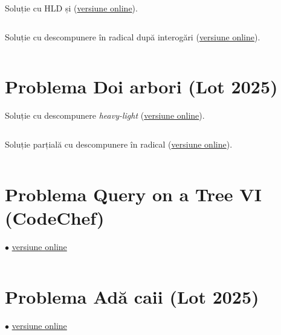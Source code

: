 \documentclass[../main.tex]{subfiles}
\begin{document}
\inputminted{cpp}{../src/trees/rafaela-hld.cpp}

Soluție cu HLD și  (\href{https://kilonova.ro/submissions/515722}{versiune online}).

\inputminted{cpp}{../src/trees/rafaela-hld-multiset.cpp}

Soluție cu descompunere în radical după interogări (\href{https://kilonova.ro/submissions/519568}{versiune online}).

\inputminted{cpp}{../src/trees/rafaela-sqrt.cpp}

\section{Problema Doi arbori (Lot 2025)}
\label{code:doi-arbori}

Soluție cu descompunere \textit{heavy-light} (\href{https://kilonova.ro/submissions/514375}{versiune online}).

\inputminted{cpp}{../src/trees/doi-arbori-hld.cpp}

Soluție parțială cu descompunere în radical (\href{https://kilonova.ro/submissions/515387}{versiune online}).

\inputminted{cpp}{../src/trees/doi-arbori-sqrt.cpp}

\section{Problema Query on a Tree VI (CodeChef)}
\label{code:qtree6}
$\bullet$
\href{https://www.codechef.com/viewsolution/1120642189}{versiune online}

\inputminted{cpp}{../src/trees/qtree6.cpp}

\section{Problema Adă caii (Lot 2025)}
\label{code:ada-caii}
$\bullet$
\href{https://kilonova.ro/submissions/774636}{versiune online}

\inputminted{cpp}{../src/trees/ada-caii.cpp}
\end{document}
